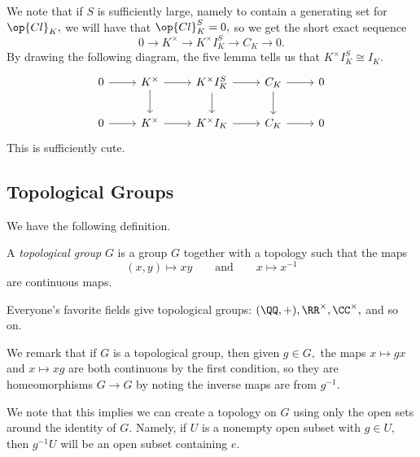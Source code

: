 We note that if $S$ is sufficiently large, namely to contain a generating set for $\op{Cl}_K,$ we will have that $\op{Cl}_K^S=0,$ so we get the short exact sequence
\[0\to K^\times\to K^\times I_K^S\to C_K\to0.\]
By drawing the following diagram, the five lemma tells us that $K^\times I_K^S\cong I_K.$
\[\begin{tikzcd}
	0 & {K^\times} & {K^\times I_K^S} & {C_K} & 0 \\
	0 & {K^\times} & {K^\times I_K} & {C_K} & 0
	\arrow[from=1-1, to=1-2]
	\arrow[from=1-2, to=1-3]
	\arrow[from=1-3, to=1-4]
	\arrow[from=1-4, to=1-5]
	\arrow[from=2-1, to=2-2]
	\arrow[from=2-2, to=2-3]
	\arrow[from=2-3, to=2-4]
	\arrow[from=2-4, to=2-5]
	\arrow[from=1-2, to=2-2]
	\arrow[from=1-3, to=2-3]
	\arrow[from=1-4, to=2-4]
\end{tikzcd}\]
This is sufficiently cute.

\subsection{Topological Groups}
We have the following definition.
\begin{definition}
	A \textit{topological group} $G$ is a group $G$ together with a topology such that the maps
	\[(x,y)\mapsto xy\qquad\text{and}\qquad x\mapsto x^{-1}\]
	are continuous maps.
\end{definition}
\begin{example}
	Everyone's favorite fields give topological groups: $(\QQ,+),\RR^\times,\CC^\times,$ and so on.
\end{example}
We remark that if $G$ is a topological group, then given $g\in G,$ the maps $x\mapsto gx$ and $x\mapsto xg$ are both continuous by the first condition, so they are homeomorphisms $G\to G$ by noting the inverse maps are from $g^{-1}.$

We note that this implies we can create a topology on $G$ using only the open sets around the identity of $G.$ Namely, if $U$ is a nonempty open subset with $g\in U,$ then $g^{-1}U$ will be an open subset containing $e.$

